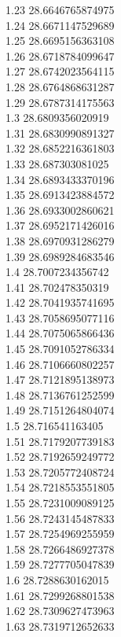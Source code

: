 {1.23	28.6646765874975\\
1.24	28.6671147529689\\
1.25	28.6695156363108\\
1.26	28.6718784099647\\
1.27	28.6742023564115\\
1.28	28.6764868631287\\
1.29	28.6787314175563\\
1.3	28.6809356020919\\
1.31	28.6830990891327\\
1.32	28.6852216361803\\
1.33	28.687303081025\\
1.34	28.6893433370196\\
1.35	28.6913423884572\\
1.36	28.6933002860621\\
1.37	28.6952171426016\\
1.38	28.6970931286279\\
1.39	28.6989284683546\\
1.4	28.7007234356742\\
1.41	28.702478350319\\
1.42	28.7041935741695\\
1.43	28.7058695077116\\
1.44	28.7075065866436\\
1.45	28.7091052786334\\
1.46	28.7106660802257\\
1.47	28.7121895138973\\
1.48	28.7136761252599\\
1.49	28.7151264804074\\
1.5	28.716541163405\\
1.51	28.7179207739183\\
1.52	28.7192659249772\\
1.53	28.7205772408724\\
1.54	28.7218553551805\\
1.55	28.7231009089125\\
1.56	28.7243145487833\\
1.57	28.7254969255959\\
1.58	28.7266486927378\\
1.59	28.7277705047839\\
1.6	28.7288630162015\\
1.61	28.7299268801538\\
1.62	28.7309627473963\\
1.63	28.7319712652633\\
}
